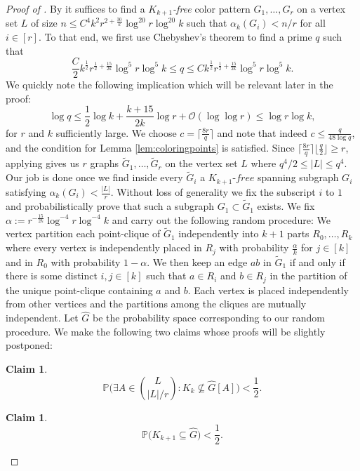 \documentclass[12pt]{article}
\newtheorem{claim}[subsection]{Claim}
\theoremstyle{definition}
\begin{document}
	\begin{proof}[Proof of ]
		By  it suffices to find a $K_{k+1}$\textit{-free} color pattern $G_1,\dots,G_r$ on a vertex set $L$ of size $n\leq C^4k^2r^{2+\frac{30}{k}}\log^{20}r\log^{20}k$ such that $\alpha_k(G_i) < n/r$ for all $i \in [r]$. To that end, we first use Chebyshev's theorem to find a prime $q$ such that 
		\[\frac{C}{2}k^{\frac{1}{2}}r^{\frac{1}{2}+ \frac{15}{2k}}\log^{5} r \log^{5}k\leq q \leq Ck^{\frac{1}{2}}r^{\frac{1}{2}+ \frac{15}{2k}}\log^{5} r \log^{5}k.\]
		We quickly note the following implication which will be relevant later in the proof: \[\log q \leq \frac{1}{2} \log k + \frac{k+15}{2k} \log r + \mathcal{O}(\log\log r) \leq \log r \log k,\]
		for $r$ and $k$ sufficiently large.
		We choose $c= \lceil \frac{8r}{q}\rceil$ and note that indeed $c \leq \frac{q}{48 \log q}$, and the condition for Lemma \ref{lem:coloringpoints} is satisfied. Since $\lceil \frac{8r}{q}\rceil \lfloor \frac{q}{2}\rfloor \geq r$, applying  gives us $r$ graphs $\tilde{G}_1,\dots,\tilde{G}_r$ on the vertex set $L$ where $q^4/2\leq |L|\leq q^4$. 
		Our job is done once we find inside every $\tilde{G}_i$ a $K_{k+1}\textit{-free}$ spanning subgraph $G_i$ satisfying $\alpha_k(G_i)<\frac{|L|}{r}$. Without loss of generality we fix the subscript $i$ to $1$ and probabilistically prove that such a subgraph $G_1 \subset \tilde{G}_1$ exists. We fix $\alpha:= r^{-\frac{15}{2k} }\log^{-4} r \log^{-4} k$ and carry out the following random procedure: We vertex partition each point-clique of $\tilde{G}_1$ independently into $k+1$ parts $R_0,\dots,R_k$ where every vertex  is independently placed in $R_j$ with probability $\frac{\alpha}{k}$ for $j \in [k]$ and in $R_0$ with probability $1-\alpha$. We then keep an edge $ab$ in $\tilde{G}_1$ if and only if there is some distinct $i,j \in [k]$ such that $a \in R_i$ and $b \in R_j$ in the partition of the unique point-clique containing $a$ and $b$. Each vertex is placed independently from other vertices and the partitions among the cliques are mutually independent. Let $\hat{G}$ be the probability space corresponding to our random procedure. We make the following two claims whose proofs will be slightly postponed:
		
		\begin{claim}\label{claim: ManyKk}
			\begin{equation}
				\mathbb{P}\Biggl( \exists A \in \binom{L}{|L|/r}: K_k \nsubseteq\hat{G}[A] \Biggr) < \frac{1}{2}.
			\end{equation}
		\end{claim}
		\begin{claim}\label{claim: NoKk+1}
			\begin{equation}
				\mathbb{P} \Biggl( K_{k+1}  \subseteq \hat{G}\Biggr) < \frac{1}{2}. 
			\end{equation}
			

\end{claim}
\end{proof}
\end{document}

